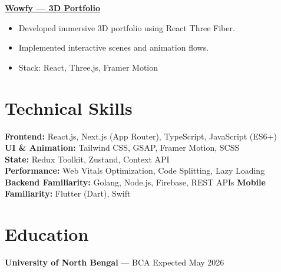 \documentclass[10pt, letterpaper]{article}
\newenvironment{tightitem}{
    \begin{itemize}[topsep=1pt, itemsep=0.5pt, parsep=0pt, leftmargin=10pt]
}{
    \end{itemize}
}
\begin{document}
\href{https://rokiroy.in}{\textbf{Wowfy — 3D Portfolio}}  
\begin{tightitem}
\item Developed immersive 3D portfolio using React Three Fiber.
\item Implemented interactive scenes and animation flows.
\item Stack: React, Three.js, Framer Motion
\end{tightitem}

\section{Technical Skills}

\textbf{Frontend:} React.js, Next.js (App Router), TypeScript, JavaScript (ES6+) \\
\textbf{UI \& Animation:} Tailwind CSS, GSAP, Framer Motion, SCSS \\
\textbf{State:} Redux Toolkit, Zustand, Context API \\
\textbf{Performance:} Web Vitals Optimization, Code Splitting, Lazy Loading \\
\textbf{Backend Familiarity:} Golang, Node.js, Firebase, REST APIs
\textbf{Mobile Familiarity:} Flutter (Dart), Swift

\section{Education}

\textbf{University of North Bengal} — BCA \hfill Expected May 2026
\end{document}
